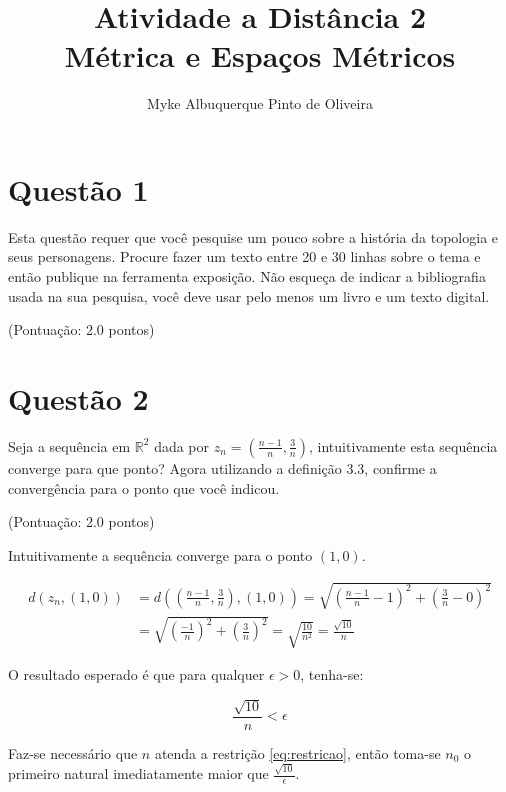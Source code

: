 \documentclass[10pt,a4paper]{article}
\author{Myke Albuquerque Pinto de Oliveira}
\title{\Huge Atividade a Distância 2 \\ 
	Métrica e Espaços Métricos}
\begin{document}
	
	\maketitle
	\newpage
	
	\section{Questão 1}
	
	Esta questão requer que você pesquise um pouco sobre a história da topologia e seus personagens. Procure fazer um texto entre 20 e 30 linhas sobre o tema e então publique na ferramenta exposição. Não esqueça de indicar a bibliografia usada na sua pesquisa, você deve usar pelo menos um livro e um texto digital.
	
	(Pontuação: 2.0 pontos)
	
	
	\section{Questão 2}
	
	Seja a sequência em $\mathbb{R}^2$ dada por $z_n = \left( \frac{n-1}{n}, \frac{3}{n} \right)$, intuitivamente esta sequência converge para que ponto? Agora utilizando a definição 3.3, confirme a convergência para o  ponto que você indicou.
	
	(Pontuação: 2.0 pontos)
	
	Intuitivamente a sequência converge para o ponto $(1, 0)$.
	
	\begin{equation}
		\begin{aligned}
		d\left(z_n, \left(1, 0\right)\right) &= d\left(\left( \frac{n-1}{n}, \frac{3}{n} \right), \left(1, 0\right)\right) = \sqrt{\left(\frac{n-1}{n} - 1\right)^2 + \left(\frac{3}{n} - 0\right)^2} \\
		&=\sqrt{\left(\frac{-1}{n}\right)^2 + \left(\frac{3}{n}\right)^2} = \sqrt{\frac{10}{n^2}} = \frac{\sqrt{10}}{n}
		\end{aligned}
	\end{equation}
	
	O resultado esperado é que para qualquer $\epsilon > 0$, tenha-se:
	
	\begin{equation}
		\frac{\sqrt{10}}{n} < \epsilon
	\end{equation}
	
	Faz-se necessário que $n$ atenda a restrição \ref{eq:restricao}, então toma-se $n_0$ o primeiro natural imediatamente maior que $\frac{\sqrt{10}}{\epsilon}$.
	
\end{document}
